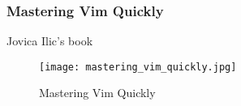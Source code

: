 \begin{frame}[fragile]
  \frametitle{Mastering Vim Quickly}
  Jovica Ilic's book \cite{ilic2018mastering}
  \begin{figure}
    \centering
    \texttt{[image: mastering\_vim\_quickly.jpg]}
    \caption{Mastering Vim Quickly}
    \label{fig:mastering-vim-quickly}
  \end{figure}
\end{frame}
